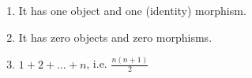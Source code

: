 \begin{enumerate}
    \item It has one object and one (identity) morphism.
    \item It has zero objects and zero morphisms.
    \item $1+2+...+n$, i.e. $\frac{n(n+1)}{2}$
  \end{enumerate}
